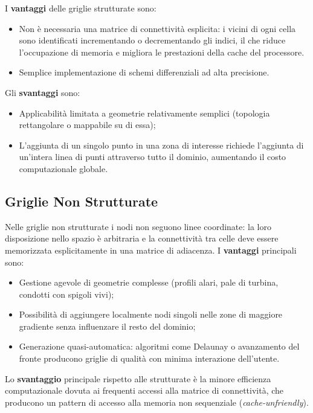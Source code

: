 I \textbf{vantaggi} delle griglie strutturate sono:
\begin{itemize}
  \item Non è necessaria una matrice di connettività esplicita: i vicini di ogni cella sono
    identificati incrementando o decrementando gli indici, il che riduce l'occupazione di memoria
    e migliora le prestazioni della cache del processore.
  \item Semplice implementazione di schemi differenziali ad alta precisione.
\end{itemize}

Gli \textbf{svantaggi} sono:
\begin{itemize}
  \item Applicabilità limitata a geometrie relativamente semplici (topologia rettangolare o
    mappabile su di essa);
  \item L'aggiunta di un singolo punto in una zona di interesse richiede l'aggiunta di un'intera
    linea di punti attraverso tutto il dominio, aumentando il costo computazionale globale.
\end{itemize}

\subsection{Griglie Non Strutturate}

Nelle griglie non strutturate i nodi non seguono linee coordinate: la loro disposizione nello
spazio è arbitraria e la connettività tra celle deve essere memorizzata esplicitamente in una
matrice di adiacenza. I \textbf{vantaggi} principali sono:
\begin{itemize}
  \item Gestione agevole di geometrie complesse (profili alari, pale di turbina, condotti con
    spigoli vivi);
  \item Possibilità di aggiungere localmente nodi singoli nelle zone di maggiore gradiente senza
    influenzare il resto del dominio;
  \item Generazione quasi-automatica: algoritmi come Delaunay o avanzamento del fronte producono
    griglie di qualità con minima interazione dell'utente.
\end{itemize}

Lo \textbf{svantaggio} principale rispetto alle strutturate è la minore efficienza computazionale
dovuta ai frequenti accessi alla matrice di connettività, che producono un pattern di accesso
alla memoria non sequenziale (\textit{cache-unfriendly}).

